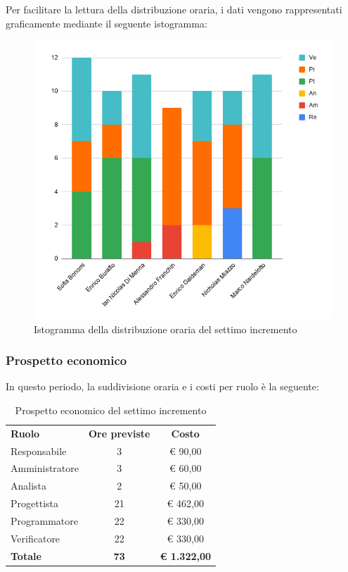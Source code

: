 \documentclass[../piano-di-progetto.tex]{subfiles}
\begin{document}
  Per facilitare la lettura della distribuzione oraria, i dati vengono rappresentati graficamente mediante il seguente istogramma:
  \begin{figure}[H]
    \centering
    \includegraphics[width=12cm]{img/ore-7-incr.png}
    \caption{Istogramma della distribuzione oraria del settimo  incremento}
    \label{fig:ore-componente-progettazione}
  \end{figure}

  \subsubsection{Prospetto economico}
  In questo periodo, la suddivisione oraria e i costi per ruolo è la seguente:

  \begin{table}[H]
    \centering
    \begin{tabular}{lcc}
      \rowcolor{lightgray}
      \textbf{Ruolo}  & \textbf{Ore previste} & \textbf{Costo}      \\
Responsabile    & 3                     & € 90,00             \\
Amministratore  & 3                     & € 60,00             \\
Analista        & 2                     & € 50,00             \\
Progettista     & 21                    & € 462,00            \\
Programmatore   & 22                    & € 330,00            \\
Verificatore    & 22                    & € 330,00            \\
\textbf{Totale} & \textbf{73}           & \textbf{€ 1.322,00}
    \end{tabular}
    \caption{Prospetto economico del settimo  incremento}
  \end{table}
\end{document}
